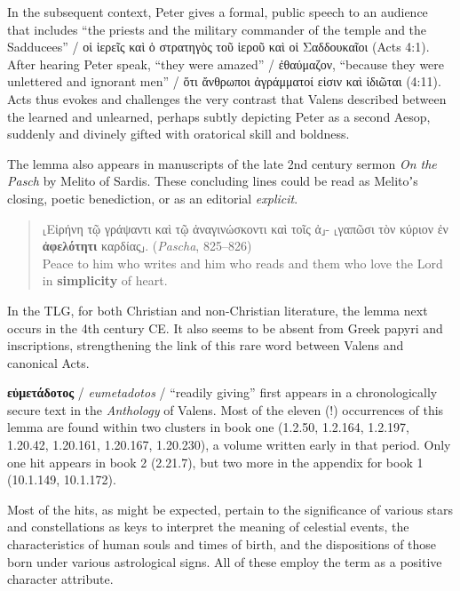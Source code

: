 In the subsequent context, %
Peter gives a formal, public speech to an audience that includes %
“the priests and the military commander of the temple and the Sadducees” / %
οἱ ἱερεῖς καὶ ὁ στρατηγὸς τοῦ ἱεροῦ καὶ οἱ Σαδδουκαῖοι (Acts 4:1). %
After hearing Peter speak, %
“they were amazed” / ἐθαύμαζον, “because they were unlettered and ignorant men” / %
ὅτι ἄνθρωποι ἀγράμματοί εἰσιν καὶ ἰδιῶται (4:11). %
Acts thus evokes and challenges the very contrast that Valens described %
between the learned and unlearned, %
perhaps subtly depicting Peter as a second Aesop, %
suddenly and divinely gifted with oratorical skill and boldness. %

The lemma also appears in manuscripts of the late 2nd century sermon \textit{On the Pasch} by Melito of Sardis. %
These concluding lines could be read as Melitoʼs closing, poetic benediction, %
or as an editorial \textit{explicit}. %

\vspace*{3mm} 
 \begin{quote}⸤Εἰρήνη τῷ γράψαντι καὶ τῷ ἀναγινώσκοντι καὶ τοῖς ἀ⸥- \newline
 ⸤γαπῶσι τὸν κύριον ἐν \textbf{ἀφελότητι} καρδίας⸥. (\textit{Pascha}, 825--826) \\[1mm] %
 Peace to him who writes and him who reads and them who \newline 
 love the Lord in \textbf{simplicity} of heart. \end{quote} %
 \vspace*{3mm}

In the TLG, for both Christian and non-Christian literature, %
the lemma next occurs in the 4th century CE. %
It also seems to be absent from Greek papyri and inscriptions, %
strengthening the link of this rare word between Valens and canonical Acts. \clearpage %

\noindent{}\textbf{εὐμετάδοτος} / \textit{eumetadotos} / “readily giving” %
first appears in a chronologically secure text %
in the \textit{Anthology} of Valens. %
Most of the eleven (!) occurrences of this lemma are found %
within two clusters in book one %
(1.2.50, 1.2.164, 1.2.197, 1.20.42, 1.20.161, 1.20.167, 1.20.230), %
a volume written early in that period. %
Only one hit appears in book 2 (2.21.7), %
but two more in the appendix for book 1 (10.1.149, 10.1.172). %

Most of the hits, as might be expected, pertain to the significance of various stars %
and constellations as keys to interpret the meaning of celestial events, %
the characteristics of human souls and times of birth, %
and the dispositions of those born under various astrological signs. %
All of these employ the term as a positive character attribute. %

